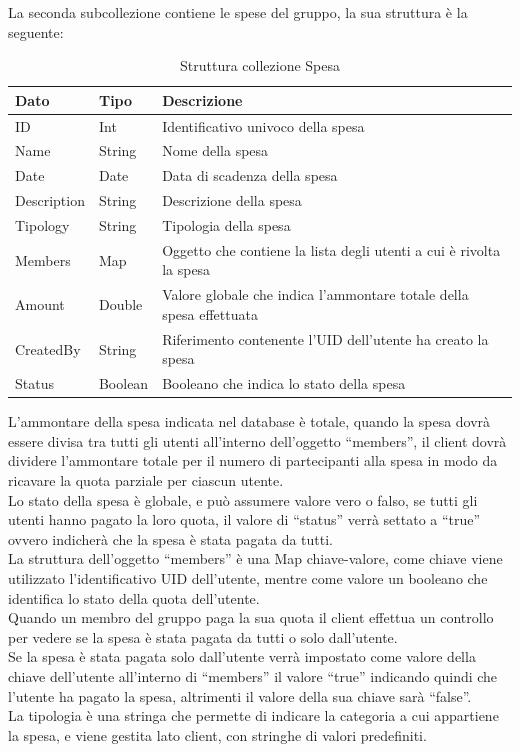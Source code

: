\newpage
La seconda subcollezione contiene le spese del gruppo, la sua struttura è la seguente:
\begin{table}[!h]
\begin{center}
\begin{tabular}{|l|l|p{9cm}|}
    \hline
\textbf{Dato} & \textbf{Tipo}  & \textbf{Descrizione}\\ \hline
ID & Int & Identificativo univoco della spesa \\ \hline
Name & String & Nome della spesa \\ \hline
Date & Date & Data di scadenza della spesa \\ \hline
Description & String & Descrizione della spesa \\ \hline
Tipology & String & Tipologia della spesa \\ \hline
Members & Map & Oggetto che contiene la lista degli utenti a cui è rivolta la spesa \\ \hline
Amount & Double & Valore globale che indica l'ammontare totale della spesa effettuata \\ \hline
CreatedBy & String &  Riferimento contenente l'UID dell'utente ha creato la spesa \\ \hline
Status & Boolean & Booleano che indica lo stato della spesa\\
\hline
\end{tabular}
\caption[Collezione Spesa]{Struttura collezione Spesa}\label{tab:Strutture collezione Spesa}
\end{center}
\end{table}

L'ammontare della spesa indicata nel database è totale, quando la spesa dovrà essere divisa tra tutti gli utenti all'interno dell'oggetto ``members'', il client dovrà dividere l'ammontare totale per il numero di partecipanti alla spesa in modo da ricavare la quota parziale per ciascun utente.\\
Lo stato della spesa è globale, e può assumere valore vero o falso, se tutti gli utenti hanno pagato la loro quota, il valore di ``status'' verrà settato a ``true'' ovvero indicherà che la spesa è stata pagata da tutti.\\
La struttura dell'oggetto ``members'' è una Map chiave-valore, come chiave viene utilizzato l'identificativo UID dell'utente, mentre come valore un booleano che identifica lo stato della quota dell'utente.\\ Quando un membro del gruppo paga la sua quota il client effettua un controllo per vedere se la spesa è stata pagata da tutti o solo dall'utente.\\
Se la spesa è stata pagata solo dall'utente verrà impostato come valore della chiave dell'utente all'interno di ``members'' il valore ``true'' indicando quindi che l'utente ha pagato la spesa, altrimenti il valore della sua chiave sarà ``false''.\\
La tipologia è una stringa che permette di indicare la categoria a cui appartiene la spesa, e viene gestita lato client, con stringhe di valori predefiniti.\\


